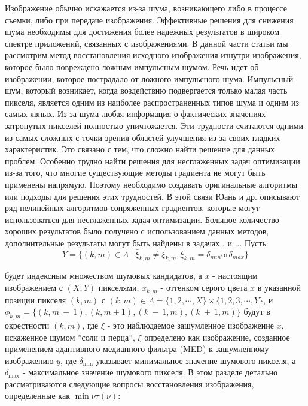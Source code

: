 Изображение обычно искажается из-за шума, возникающего либо в процессе съемки,
либо при передаче изображения. Эффективные решения для снижения шума необходимы
для достижения более надежных результатов в широком спектре приложений,
связанных с изображениями. В данной части статьи мы рассмотрим метод
восстановления исходного изображения изнутри изображения, которое было
повреждено ложным импульсным шумом. Речь идет об изображении, которое пострадало
от ложного импульсного шума. Импульсный шум, который возникает, когда
воздействию подвергается только малая часть пикселя, является одним из наиболее
распространенных типов шума и одним из самых явных. Из-за шума любая информация
о фактических значениях затронутых пикселей полностью уничтожается. Эти
трудности считаются одними из самых сложных с точки зрения областей улучшения
из-за своих гладких характеристик. Это связано с тем, что сложно найти решение
для данных проблем. Особенно трудно найти решения для несглаженных задач
оптимизации из-за того, что многие существующие методы градиента не могут быть
применены напрямую. Поэтому необходимо создавать оригинальные алгоритмы или
подходы для решения этих трудностей. В этой связи Юань и др.
\cite{art18,art19,art20,art21} описывают ряд нелинейных алгоритмов сопряженных
градиентов, которые могут использоваться для несглаженных задач оптимизации.
Большое количество хороших результатов было получено с использованием данных
методов, дополнительные результаты могут быть найдены в задачах
\cite{art22,art23,art24,art25,art26}, и ... Пусть:
\begin{equation*}
    Y=\{(k,m)\in\Lambda\mid\bar{\xi}_{k,m}\neq\xi_{k,m},\xi_{k,m}=\delta_{m i n} \text{or} \delta_{m a x}\}
\end{equation*}

будет индексным множеством шумовых кандидатов, а $x$ - настоящим изображением с
$\left( X, Y \right)$ пикселями, $x_{k,m}$ - оттенком серого цвета $x$ в
указанной позиции пикселя $\left( k, m \right)$ с
$(k,m)\in\Lambda=\{1,2,\cdots,X\}\times\{1,2,3,\cdots,Y\}$, и $\phi_{k,m}
= \{(k,m\:-\:1),(k,m+1),(k\:-\:1,m),(k\:+\:1,m)\}$ будут в окрестности $\left(k,
m \right)$, где $\xi$ - это наблюдаемое зашумленное изображение $x$, искаженное
шумом ''соли и перца'', $\overline{{\xi}}$ определено как изображение, созданное
применением адаптивного медианного фильтра (MED) к зашумленному изображению $y$,
где $\delta_{\min}$ указывает минимальное значение шумового пикселя, а $\delta_{\max}$ -
максимальное значение шумового пикселя. В этом разделе детально рассматриваются
следующие вопросы восстановления изображения, определенные как 
$\min\limits{\nu}\tau \left( \nu \right)$:

